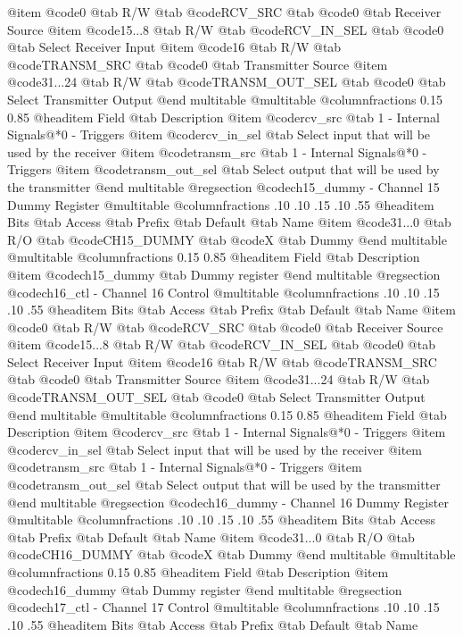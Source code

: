 @item @code{0}
@tab R/W @tab
@code{RCV_SRC}
@tab @code{0} @tab 
Receiver Source
@item @code{15...8}
@tab R/W @tab
@code{RCV_IN_SEL}
@tab @code{0} @tab 
Select Receiver Input
@item @code{16}
@tab R/W @tab
@code{TRANSM_SRC}
@tab @code{0} @tab 
Transmitter Source
@item @code{31...24}
@tab R/W @tab
@code{TRANSM_OUT_SEL}
@tab @code{0} @tab 
Select Transmitter Output
@end multitable
@multitable @columnfractions 0.15 0.85
@headitem Field @tab Description
@item @code{rcv_src} @tab 1 - Internal Signals@*0 - Triggers
@item @code{rcv_in_sel} @tab Select input that will be used by the receiver
@item @code{transm_src} @tab 1 - Internal Signals@*0 - Triggers
@item @code{transm_out_sel} @tab Select output that will be used by the transmitter
@end multitable
@regsection @code{ch15_dummy} - Channel 15 Dummy Register
@multitable @columnfractions .10 .10 .15 .10 .55
@headitem Bits @tab Access @tab Prefix @tab Default @tab Name
@item @code{31...0}
@tab R/O @tab
@code{CH15_DUMMY}
@tab @code{X} @tab 
Dummy
@end multitable
@multitable @columnfractions 0.15 0.85
@headitem Field @tab Description
@item @code{ch15_dummy} @tab Dummy register
@end multitable
@regsection @code{ch16_ctl} - Channel 16 Control
@multitable @columnfractions .10 .10 .15 .10 .55
@headitem Bits @tab Access @tab Prefix @tab Default @tab Name
@item @code{0}
@tab R/W @tab
@code{RCV_SRC}
@tab @code{0} @tab 
Receiver Source
@item @code{15...8}
@tab R/W @tab
@code{RCV_IN_SEL}
@tab @code{0} @tab 
Select Receiver Input
@item @code{16}
@tab R/W @tab
@code{TRANSM_SRC}
@tab @code{0} @tab 
Transmitter Source
@item @code{31...24}
@tab R/W @tab
@code{TRANSM_OUT_SEL}
@tab @code{0} @tab 
Select Transmitter Output
@end multitable
@multitable @columnfractions 0.15 0.85
@headitem Field @tab Description
@item @code{rcv_src} @tab 1 - Internal Signals@*0 - Triggers
@item @code{rcv_in_sel} @tab Select input that will be used by the receiver
@item @code{transm_src} @tab 1 - Internal Signals@*0 - Triggers
@item @code{transm_out_sel} @tab Select output that will be used by the transmitter
@end multitable
@regsection @code{ch16_dummy} - Channel 16 Dummy Register
@multitable @columnfractions .10 .10 .15 .10 .55
@headitem Bits @tab Access @tab Prefix @tab Default @tab Name
@item @code{31...0}
@tab R/O @tab
@code{CH16_DUMMY}
@tab @code{X} @tab 
Dummy
@end multitable
@multitable @columnfractions 0.15 0.85
@headitem Field @tab Description
@item @code{ch16_dummy} @tab Dummy register
@end multitable
@regsection @code{ch17_ctl} - Channel 17 Control
@multitable @columnfractions .10 .10 .15 .10 .55
@headitem Bits @tab Access @tab Prefix @tab Default @tab Name

